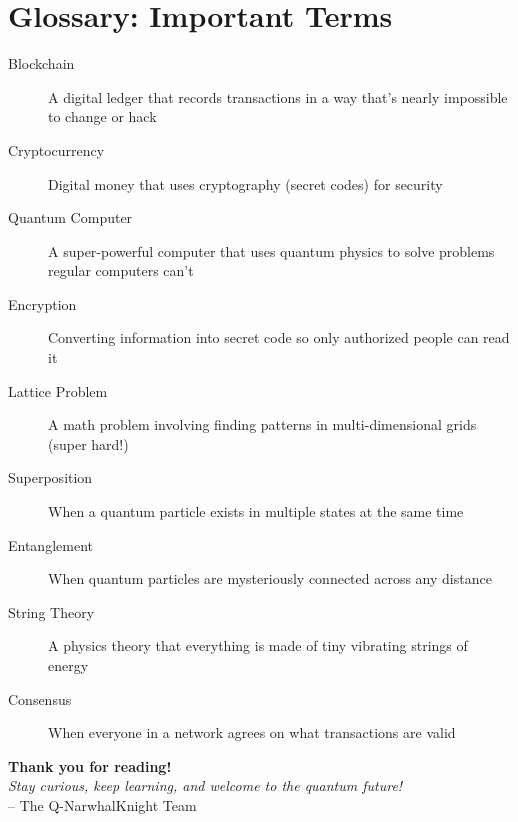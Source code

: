\documentclass[11pt,a4paper]{article}
\begin{document}
\section*{Glossary: Important Terms}

\begin{description}
    \item[Blockchain] A digital ledger that records transactions in a way that's nearly impossible to change or hack

    \item[Cryptocurrency] Digital money that uses cryptography (secret codes) for security

    \item[Quantum Computer] A super-powerful computer that uses quantum physics to solve problems regular computers can't

    \item[Encryption] Converting information into secret code so only authorized people can read it

    \item[Lattice Problem] A math problem involving finding patterns in multi-dimensional grids (super hard!)

    \item[Superposition] When a quantum particle exists in multiple states at the same time

    \item[Entanglement] When quantum particles are mysteriously connected across any distance

    \item[String Theory] A physics theory that everything is made of tiny vibrating strings of energy

    \item[Consensus] When everyone in a network agrees on what transactions are valid
\end{description}

\vspace{2cm}

\begin{center}
\Large
\textbf{Thank you for reading!}\\
\vspace{0.5cm}
\large
\textit{Stay curious, keep learning, and welcome to the quantum future!}\\
\vspace{0.5cm}
-- The Q-NarwhalKnight Team
\end{center}
\end{document}
